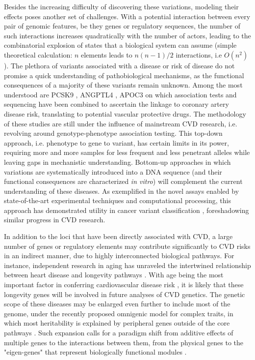 \documentclass[letter]{bioinfo}
\begin{document}
Besides the increasing difficulty of discovering these variations, modeling their effects poses another set of challenges. With a potential interaction between every pair of genomic features, be they genes or regulatory sequences, the number of such interactions increases quadratically with the number of actors, leading to the combinatorial explosion of states that a biological system can assume (simple theoretical calculation: $n$ elements leads to $n(n-1)/2$ interactions, i.e $O(n^2)$).  The plethora of variants associated with a disease or risk of disease do not promise a quick understanding of pathobiological mechanisms, as the functional consequences of a majority of these variants remain unknown. Among the most understood are PCSK9 \citep{Cohen:2006:Sequence}, ANGPTL4 \citep{Dewey:2016:Inactivating,CARDIoGRAM:2016:Coding}, APOC3 \citep{NHLBI:2014:LossofFunction} on which association tests and sequencing have been combined to ascertain the linkage to coronary artery disease risk, translating to potential vascular protective drugs. The methodology of these studies are still under the influence of mainstream CVD research, i.e. revolving around genotype-phenotype association testing. This top-down approach, i.e. phenotype to gene to variant, has certain limits in its power, requiring more and more samples for less frequent and less penetrant alleles while leaving gaps in mechanistic understanding. Bottom-up approaches in which variations are systematically introduced into a DNA sequence (and their functional consequences are characterized \textit{in vitro}) will complement the current understanding of these diseases. As exemplified in the novel assays enabled by state-of-the-art experimental techniques and computational processing, this approach has demonstrated utility in cancer variant classification \citep{Findlay:2018:Accurate}, foreshadowing similar progress in CVD research.

In addition to the loci that have been directly associated with CVD, a large number of genes or regulatory elements may contribute significantly to CVD risks in an indirect manner, due to highly interconnected biological pathways.  For instance, independent research in aging has unraveled the intertwined relationship between heart disease and longevity pathways \citep{North:2012:Intersection}.  With age being the most important factor in conferring cardiovascular disease risk \citep{Steenman:2017:Cardiac}, it is likely that these longevity genes will be involved in future analyses of CVD genetics. The genetic scope of these diseases may be enlarged even further to include most of the genome, under the recently proposed omnigenic model for complex traits, in which most heritability is explained by peripheral genes outside of the core pathways \citep{Boyle:2017:Expanded}. Such expansion calls for a paradigm shift from additive effects of multiple genes to the interactions between them, from the physical genes to the "eigen-genes" that represent biologically functional modules \citep{Weiss:2012:Good}.
	
\end{document}
